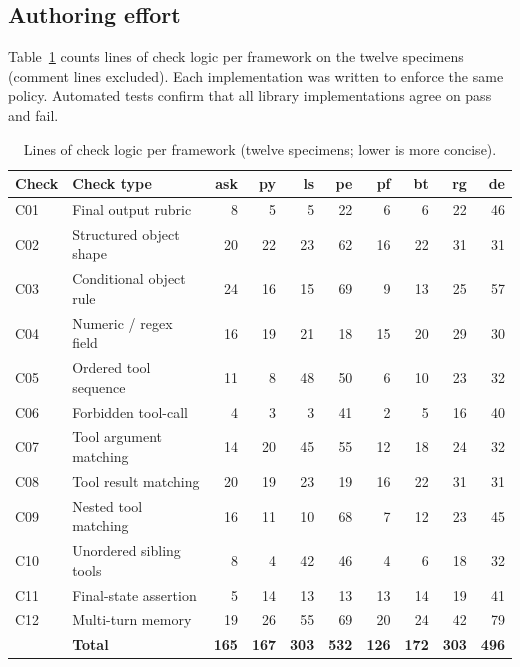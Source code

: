 \subsection{Authoring effort}

Table~\ref{tab:expressiveness-loc} counts lines of check logic per framework on the twelve specimens (comment lines excluded). Each implementation was written to enforce the same policy. Automated tests confirm that all library implementations agree on pass and fail.

\begin{table}[htbp]
\centering
\caption{Lines of check logic per framework (twelve specimens; lower is more concise).}
\label{tab:expressiveness-loc}
\scriptsize
\begin{tabular}{@{}lp{2.4cm}rrrrrrrr@{}}
\toprule
Check & Check type & ask & py & ls & pe & pf & bt & rg & de \\
\midrule
C01 & Final output rubric & 8 & 5 & 5 & 22 & 6 & 6 & 22 & 46 \\
C02 & Structured object shape & 20 & 22 & 23 & 62 & 16 & 22 & 31 & 31 \\
C03 & Conditional object rule & 24 & 16 & 15 & 69 & 9 & 13 & 25 & 57 \\
C04 & Numeric / regex field & 16 & 19 & 21 & 18 & 15 & 20 & 29 & 30 \\
C05 & Ordered tool sequence & 11 & 8 & 48 & 50 & 6 & 10 & 23 & 32 \\
C06 & Forbidden tool-call & 4 & 3 & 3 & 41 & 2 & 5 & 16 & 40 \\
C07 & Tool argument matching & 14 & 20 & 45 & 55 & 12 & 18 & 24 & 32 \\
C08 & Tool result matching & 20 & 19 & 23 & 19 & 16 & 22 & 31 & 31 \\
C09 & Nested tool matching & 16 & 11 & 10 & 68 & 7 & 12 & 23 & 45 \\
C10 & Unordered sibling tools & 8 & 4 & 42 & 46 & 4 & 6 & 18 & 32 \\
C11 & Final-state assertion & 5 & 14 & 13 & 13 & 13 & 14 & 19 & 41 \\
C12 & Multi-turn memory & 19 & 26 & 55 & 69 & 20 & 24 & 42 & 79 \\
\midrule
 & \textbf{Total} & \textbf{165} & \textbf{167} & \textbf{303} & \textbf{532} & \textbf{126} & \textbf{172} & \textbf{303} & \textbf{496} \\
\bottomrule
\end{tabular}
\end{table}

